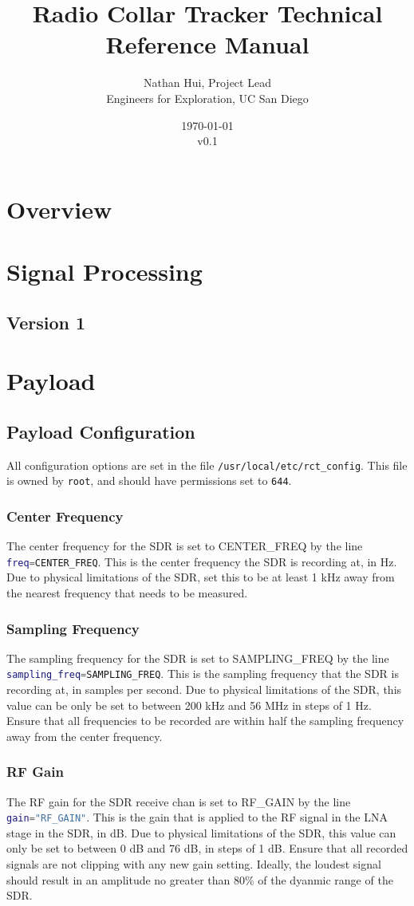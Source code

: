 \documentclass{report}
\title{Radio Collar Tracker Technical Reference Manual}
\author{Nathan Hui, Project Lead\\Engineers for Exploration, UC San Diego}
\date{\today\\v0.1}
\begin{document}
	\maketitle
	\tableofcontents
	\listoffigures
	\listoftables
	\chapter{Overview}
	\chapter{Signal Processing}
		\section{Version 1}
			
	\chapter{Payload}
		\section{Payload Configuration}
			All configuration options are set in the file \lstinline[language=sh]{/usr/local/etc/rct_config}.  This file is owned by \lstinline[language=sh]{root}, and should have permissions set to \lstinline{644}.
			\subsection{Center Frequency}
				The center frequency for the SDR is set to CENTER\_FREQ by the line \lstinline[language=sh]{freq=CENTER_FREQ}.  This is the center frequency the SDR is recording at, in Hz.  Due to physical limitations of the SDR, set this to be at least 1 kHz away from the nearest frequency that needs to be measured.
			\subsection{Sampling Frequency}
				The sampling frequency for the SDR is set to SAMPLING\_FREQ by the line \lstinline[language=sh]{sampling_freq=SAMPLING_FREQ}.  This is the sampling frequency that the SDR is recording at, in samples per second.  Due to physical limitations of the SDR, this value can be only be set to between 200 kHz and 56 MHz in steps of 1 Hz.  Ensure that all frequencies to be recorded are within half the sampling frequency away from the center frequency.
			\subsection{RF Gain}
				The RF gain for the SDR receive chan is set to RF\_GAIN by the line \lstinline[language=sh]{gain="RF_GAIN"}.  This is the gain that is applied to the RF signal in the LNA stage in the SDR, in dB.  Due to physical limitations of the SDR, this value can only be set to between 0 dB and 76 dB, in steps of 1 dB.  Ensure that all recorded signals are not clipping with any new gain setting.  Ideally, the loudest signal should result in an amplitude no greater than 80\% of the dyanmic range of the SDR.
\end{document}
